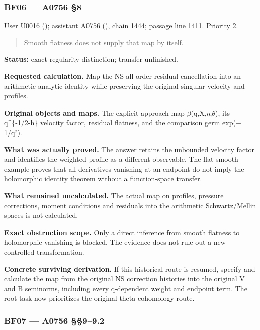 \documentclass[10pt,a4paper,oneside]{report}
\begin{document}
\subsubsection{BF06 --- A0756 §8}\label{bf06-a0756-8}

User U0016 (\protect{});
assistant A0756 (\protect{}),
chain 1444; passage line 1411. Priority 2.

\begin{quote}
Smooth flatness does not supply that map by itself.
\end{quote}

\textbf{Status:} exact regularity distinction; transfer unfinished.

\textbf{Requested calculation.} Map the NS all-order residual
cancellation into an arithmetic analytic identity while preserving the
original singular velocity and profiles.

\textbf{Original objects and maps.} The explicit approach map
\allowbreak{}\ensuremath{β}\allowbreak{}(q,X,\allowbreak{}\ensuremath{η}\allowbreak{},\allowbreak{}\ensuremath{θ}\allowbreak{}),
its q\^{}\{-1/2-h\} velocity factor, residual flatness, and the
comparison germ exp(\allowbreak{}\ensuremath{−}\allowbreak{}1/q²).

\textbf{What was actually proved.} The answer retains the unbounded
velocity factor and identifies the weighted profile as a different
observable. The flat smooth example proves that all derivatives
vanishing at an endpoint do not imply the holomorphic identity theorem
without a function-space transfer.

\textbf{What remained uncalculated.} The actual map on profiles,
pressure corrections, moment conditions and residuals into the
arithmetic Schwartz/Mellin spaces is not calculated.

\textbf{Exact obstruction scope.} Only a direct inference from smooth
flatness to holomorphic vanishing is blocked. The evidence does not rule
out a new controlled transformation.

\textbf{Concrete surviving derivation.} If this historical route is
resumed, specify and calculate the map from the original NS correction
histories into the original V and B seminorms, including every
q-dependent weight and endpoint term. The root task now prioritizes the
original theta cohomology route.

\subsubsection{BF07 --- A0756 §§9--9.2}\label{bf07-a0756-99.2}
\end{document}
